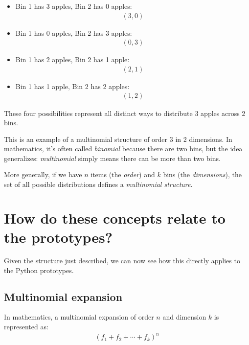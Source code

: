 \documentclass[11pt]{article}
\begin{document}
\begin{itemize}
    \item Bin 1 has 3 apples, Bin 2 has 0 apples:
    \begin{align*}
    (3,0)
    \end{align*}
    
    \item Bin 1 has 0 apples, Bin 2 has 3 apples:
    \begin{align*}
    (0,3)
    \end{align*}
    
    \item Bin 1 has 2 apples, Bin 2 has 1 apple:
    \begin{align*}
    (2,1)
    \end{align*}
    
    \item Bin 1 has 1 apple, Bin 2 has 2 apples:
    \begin{align*}
    (1,2)
    \end{align*}
\end{itemize}

These four possibilities represent all distinct ways to distribute 3 apples across 2 bins. 

This is an example of a multinomial structure of order 3 in 2 dimensions. In mathematics, it's often called \emph{binomial} because there are two bins, but the idea generalizes: \emph{multinomial} simply means there can be more than two bins.

More generally, if we have $n$ items (the \textit{order}) and $k$ bins (the \textit{dimensions}), the set of all possible distributions defines a \emph{multinomial structure}.

\section{How do these concepts relate to the prototypes?}

Given the structure just described, we can now see how this directly applies to the Python prototypes.

\subsection{Multinomial expansion}

In mathematics, a multinomial expansion of order $n$ and dimension $k$ is represented as:
\begin{align*}
    (f_1 + f_2 + \cdots + f_k)^n
\end{align*}
\end{document}
